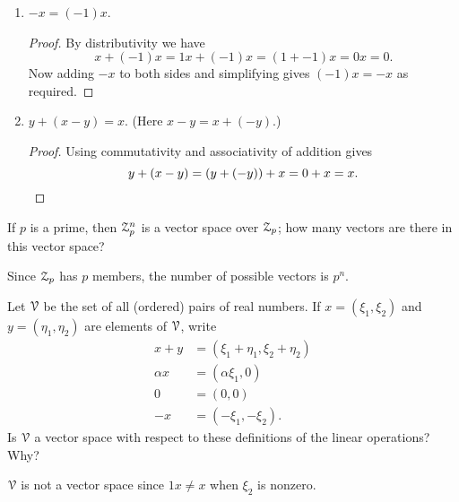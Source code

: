\begin{enumerate}
\begin{proof}
    which implies
    \begin{equation*}
      1x = x = 0,
    \end{equation*}
    completing the proof.
  \end{proof}
\item $-x = (-1)x$.
  \begin{proof}
    By distributivity we have
    \begin{equation*}
      x + (-1)x = 1x + (-1)x = (1 + -1)x = 0x = 0.
    \end{equation*}
    Now adding $-x$ to both sides and simplifying gives $(-1)x = -x$
    as required.
  \end{proof}
\item $y + (x - y) = x$. (Here $x - y = x + (-y)$.)
  \begin{proof}
    Using commutativity and associativity of addition gives
    \begin{equation*}
      y + (x - y) = (y + (-y)) + x = 0 + x = x.\qedhere
    \end{equation*}
  \end{proof}
\end{enumerate}

 If $p$ is a prime, then $\mathcal{Z}_p^n$ is a vector space over
$\mathcal{Z}_p$; how many vectors are there in this vector space?
\begin{solution}
  Since $\mathcal{Z}_p$ has $p$ members, the number of possible vectors is
  $p^n$.
\end{solution}

 Let $\mathcal{V}$ be the set of all (ordered) pairs of real
numbers. If $x = (\xi_1,\xi_2)$ and $y = (\eta_1,\eta_2)$ are elements
of $\mathcal{V}$, write
\begin{align*}
  x + y &= (\xi_1 + \eta_1, \xi_2 + \eta_2) \\
  \alpha x &= (\alpha\xi_1, 0) \\
  0 &= (0, 0) \\
  -x &= (-\xi_1, -\xi_2).
\end{align*}
Is $\mathcal{V}$ a vector space with respect to these definitions of the linear
operations? Why?
\begin{solution}
  $\mathcal{V}$ is not a vector space since $1x \neq x$ when $\xi_2$ is
  nonzero.
\end{solution}

